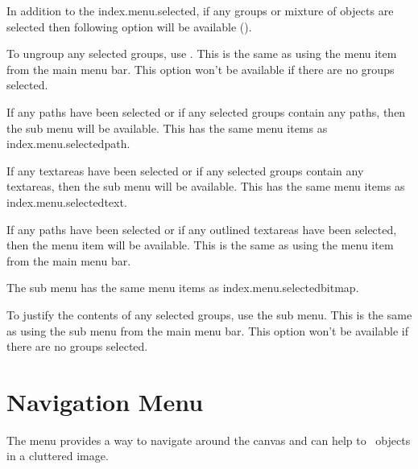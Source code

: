 In addition to the \gls{index.menu.selected},
if any \glspl{group} or mixture of \glspl{object} are selected 
then following option will be available
().


To ungroup any selected \glspl{group}, use
. This is the same as using the
 menu item from the main menu bar.
This option won't be available if there are no
\glspl{group} selected.


If any \glspl{path} have been selected or if any selected
\glspl{group} contain any \glspl{path}, then the
 sub menu will be available. This has the same
menu items as \gls{index.menu.selectedpath}.


If any \glspl{textarea} have been selected or if any selected
\glspl{group} contain any \glspl{textarea}, then the
 sub menu will be available. This has the same
menu items as \gls{index.menu.selectedtext}.


If any \glspl{path} have been selected or if any outlined \glspl{textarea}
have been selected, then the  menu item
will be available. This is the same as using the
 menu item from the main menu bar.


The  sub menu has the same
menu items as \gls{index.menu.selectedbitmap}.


To justify the contents of any selected \glspl{group}, use the
 sub menu. This is the same as using the
 sub menu from the main menu bar.
This option won't be available if there are no
\glspl{group} selected.


\section{Navigation Menu}\label{sec:navigate}


The  menu provides a way to navigate around the
\gls{canvas} and can help to \select\ \glspl{object}
in a cluttered image.

